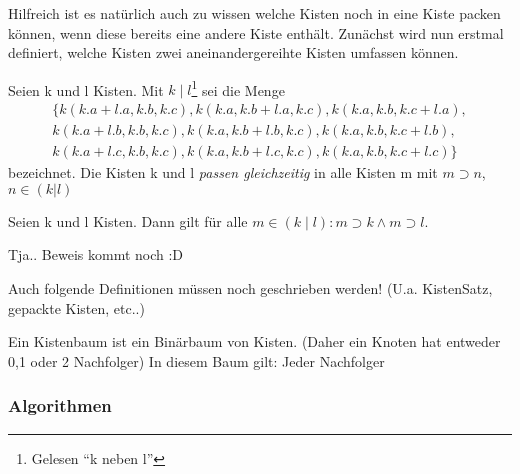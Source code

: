 Hilfreich ist es natürlich auch zu wissen welche Kisten noch in eine Kiste packen können, wenn diese bereits eine andere Kiste enthält.
Zunächst wird nun erstmal definiert, welche Kisten zwei aneinandergereihte Kisten umfassen können.
\begin{defi}[$\mid$]
 Seien k und l Kisten.
 Mit $k \mid l$\footnote{Gelesen ``k neben l''} sei die Menge
\begin{align*}
 \{k(k.a+l.a, k.b, k.c),k(k.a, k.b+l.a, k.c),k(k.a, k.b, k.c+l.a), \\
   k(k.a+l.b, k.b, k.c),k(k.a, k.b+l.b, k.c),k(k.a, k.b, k.c+l.b), \\
   k(k.a+l.c, k.b, k.c),k(k.a, k.b+l.c, k.c),k(k.a, k.b, k.c+l.c) \}
\end{align*}
bezeichnet. Die Kisten k und l \emph{passen gleichzeitig} in alle Kisten m mit $m \supset n$, $n \in (k | l)$
\end{defi}
\begin{satz}
 Seien k und l Kisten. Dann gilt für alle $m \in (k \mid l): m \supset k \wedge m \supset l.$
\end{satz}
\begin{bew}
 Tja.. Beweis kommt noch :D
\end{bew}
Auch folgende Definitionen müssen noch geschrieben werden! (U.a. KistenSatz, gepackte Kisten, etc..)
\begin{defi}[Kistenbaum]
Ein Kistenbaum ist ein Binärbaum von Kisten. (Daher ein Knoten hat entweder 0,1 oder 2 Nachfolger)
In diesem Baum gilt: Jeder Nachfolger
\end{defi}

\subsubsection{Algorithmen}
